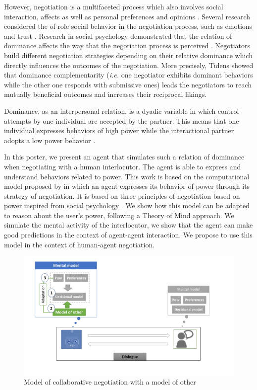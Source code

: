 \documentclass[sigconf]{aamas}  %
\begin{document}
	However, negotiation is a multifaceted process which also involves social interaction, affects as well as personal preferences and opinions  \cite{bro2010affective}. Several research considered the of role social behavior in the negotiation process, such as emotions and trust	\cite{de2011effect}. Research in social psychology demonstrated that the relation of dominance affects the way that the negotiation process is perceived \cite{van2006power}. Negotiators build different negotiation strategies depending on their relative dominance which directly influences the outcomes of the negotiation. More precisely, Tidens \cite{tiedens2003power} showed that dominance complementarity (\emph{i.e.} one negotiator exhibits dominant behaviors while the other one responds with submissive ones) leads the negotiators to reach mutually beneficial outcomes and increases their reciprocal likings.
	
	Dominance, as an interpersonal relation, is a dyadic variable in which control attempts by one individual are accepted by the partner. This means that one individual expresses behaviors of high power while the interactional partner adopts a low power behavior \cite{burgoon1998nature}. 
	
	In this poster, we present an agent that simulates such a relation of dominance when negotiating with a human interlocutor. The agent is able to express and understand behaviors related to power. This work is based on the computational model proposed by \cite{ouali2017computational} in which an agent expresses its behavior of power through its strategy of negotiation. It is based on three principles of negotiation based on power inspired from social psychology \cite{de1995impact,van2006power,magee2007power}. We show how this model can be adapted to reason about the user's power, following a Theory of Mind approach. We simulate the mental activity of the interlocutor, we show that the agent can make good predictions in the context of agent-agent interaction. We propose to use this model in the context of human-agent negotiation.
	
	\begin{figure}
		\includegraphics[width=0.65\linewidth, height= 0.25\textheight]{figs/model_tom.pdf}
		\caption{Model of collaborative negotiation with a model of other} 
		\label{fig:schema-general}
	\end{figure} 
\end{document}
